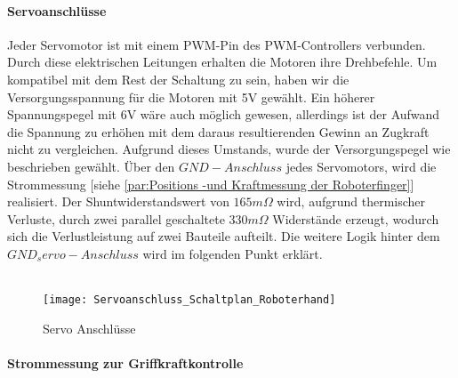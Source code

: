 \documentclass[titlepage,12pt,twoside]{article}
\begin{document}
\paragraph{Servoanschlüsse}
\hfill \break
\hfill \break
Jeder Servomotor ist mit einem PWM-Pin des PWM-Controllers verbunden. Durch diese elektrischen Leitungen erhalten die Motoren ihre Drehbefehle. Um kompatibel mit dem Rest der Schaltung zu sein, haben wir die Versorgungsspannung für die Motoren mit
5V gewählt. Ein höherer Spannungspegel mit 6V wäre auch möglich gewesen, allerdings ist der Aufwand die Spannung zu erhöhen mit dem daraus resultierenden Gewinn an Zugkraft nicht zu vergleichen. Aufgrund dieses Umstands, wurde der Versorgungspegel
wie beschrieben gewählt. Über den $GND-Anschluss$ jedes Servomotors, wird die Strommessung [siehe \textcolor{blue}{\autoref{par:Positions -und Kraftmessung der Roboterfinger}}] realisiert. Der Shuntwiderstandswert von $165m\Omega$ wird, aufgrund thermischer Verluste, durch zwei parallel geschaltete $330m\Omega$ 
Widerstände erzeugt, wodurch sich die Verlustleistung auf zwei Bauteile aufteilt. Die weitere Logik hinter dem $GND_servo-Anschluss$ wird im folgenden Punkt erklärt. \\
\\
\begin{figure}[H]
	\begin{center}
		\scalebox{0.6}
		{\texttt{[image: Servoanschluss\_Schaltplan\_Roboterhand]}}
		\caption{Servo Anschlüsse}
		\label{fig:Servoanschluss_Schaltplan_Roboterhand}		
	\end{center}
\end{figure}
\hfill \break

\paragraph{Strommessung zur Griffkraftkontrolle}
\hfill \break
\hfill \break
\end{document}
